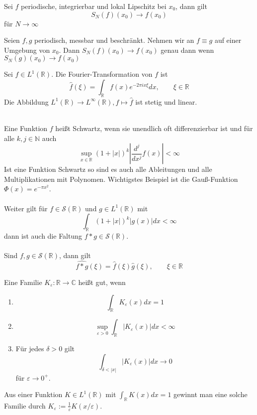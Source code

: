 \documentclass[11pt]{article}
\newenvironment{problem}[1]{
    \begin{trivlist}
        \item[\hskip \labelsep {\bfseries #1}] }{
    \end{trivlist}\normalshape
}
\newcommand{\N}{\mathbb{N}}
\newcommand{\R}{\mathbb{R}}
\newcommand{\C}{\mathbb{C}}
\begin{document}
    \begin{problem}{Lipschitz}
        Sei $f$ periodische, integrierbar und lokal Lipschitz bei $x_0$, dann gilt
        $$S_N(f)(x_0)\to f(x_0)$$
        für $N\to\infty$
    \end{problem}

    \begin{problem}{Lokalisierungsprinzip von Riemann}
        Seien $f,g$ periodisch, messbar und beschränkt. Nehmen wir an $f\equiv g$ auf einer Umgebung von
        $x_0$. Dann $S_N(f)(x_0)\to f(x_0)$ genau dann wenn $S_N(g)(x_0)\to f(x_0)$
    \end{problem}

    \begin{problem}{Fourier-Transformation}
        Sei $f\in L^1 (\R)$. Die Fourier-Transformation von $f$ ist
        $$\hat{f}(\xi) = \int_\R f(x)e^{-2\pi i x\xi}dx,\qquad \xi \in\R$$
        Die Abbildung $L^1(\R)\to L^{\infty}(\R), f\mapsto \hat{f}$ ist
        stetig und linear.\\\\
    \end{problem}

    \begin{problem}{Schwartz-Funktionen}
        Eine Funktion $f$ heißt Schwartz, wenn sie unendlich oft differenzierbar
        ist und für alle $k,j\in\N$ auch
        $$\sup_{x\in \R} (1+|x|)^k \left|\frac{d^j}{dx^j}f(x)\right|<\infty$$
        Ist eine Funktion Schwartz so sind es auch alle Ableitungen
        und alle Multiplikationen mit Polynomen. Wichtigstes Beispiel
        ist die Gauß-Funktion $\Phi(x) = e^{-\pi x^2}$. \\\\
        Weiter gilt für $f\in\mathcal{S}(\R)$ und $g\in L^1(\R)$ mit
        $$\int_\R (1+|x|)^k|g(x)|dx <\infty$$
        dann ist auch die Faltung $f*g\in \mathcal{S}(\R)$. \\\\
        Sind $f,g\in\mathcal{S}(\R)$, dann gilt
        $$\widehat{f*g}(\xi) = \hat{f}(\xi)\hat{g}(\xi),\qquad \xi\in \R$$
    \end{problem}

    \begin{problem}{Familie von guten Kerne}
        Eine Familie $K_\varepsilon:\R\to\C$ heißt gut, wenn
        \begin{enumerate}[label = (\roman{enumi})]
            \item
            $$\int_{\R} K_\varepsilon(x)dx=1$$
            \item
            $$\sup_{\varepsilon >0}\int_{\R} |K_\varepsilon(x)|dx<\infty$$
            \item Für jedes $\delta>0$ gilt
            $$\int_{\delta< |x|}|K_\varepsilon(x)|dx\to 0 $$
            für $\varepsilon\to 0^+$.
        \end{enumerate}
        Aus einer Funktion $K\in L^1(\R)$ mit $\int_\R K(x)dx = 1$ gewinnt
        man eine solche Familie durch $K_\varepsilon:= \frac{1}{\varepsilon}
        K(x/\varepsilon)$.
    \end{problem}
\end{document}
